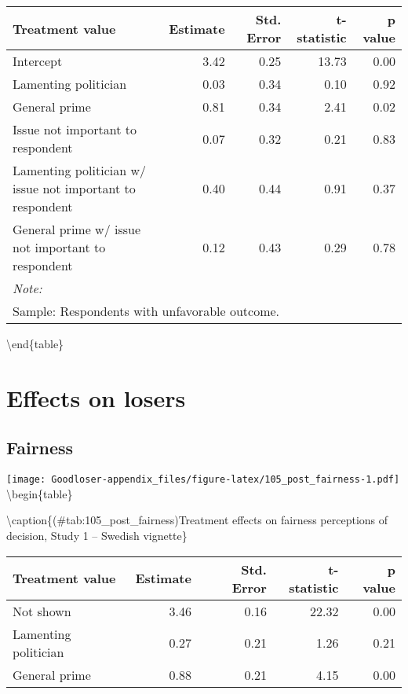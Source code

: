 \documentclass[
]{book}
\begin{document}
\begin{tabular}[t]{lrrrr}
\toprule
Treatment value & Estimate & Std. Error & t-statistic & p value\\
\midrule
Intercept & 3.42 & 0.25 & 13.73 & 0.00\\
Lamenting politician & 0.03 & 0.34 & 0.10 & 0.92\\
General prime & 0.81 & 0.34 & 2.41 & 0.02\\
Issue not important to respondent & 0.07 & 0.32 & 0.21 & 0.83\\
Lamenting politician w/ issue not important to respondent & 0.40 & 0.44 & 0.91 & 0.37\\
\addlinespace
General prime w/ issue not important to respondent & 0.12 & 0.43 & 0.29 & 0.78\\
\bottomrule
\multicolumn{5}{l}{\textit{Note: }}\\
\multicolumn{5}{l}{Sample: Respondents with unfavorable outcome.}\\
\end{tabular}

\textbackslash end\{table\}

\hypertarget{effects-on-losers}{%
\chapter{Effects on losers}\label{effects-on-losers}}

\hypertarget{fairness-1}{%
\section{Fairness}\label{fairness-1}}

\texttt{[image: Goodloser-appendix\_files/figure-latex/105\_post\_fairness-1.pdf]} \textbackslash begin\{table\}

\textbackslash caption\{(\#tab:105\_post\_fairness)Treatment effects on fairness perceptions of decision, Study 1 -- Swedish vignette\}
\centering

\begin{tabular}[t]{lrrrr}
\toprule
Treatment value & Estimate & Std. Error & t-statistic & p value\\
\midrule
Not shown & 3.46 & 0.16 & 22.32 & 0.00\\
Lamenting politician & 0.27 & 0.21 & 1.26 & 0.21\\
General prime & 0.88 & 0.21 & 4.15 & 0.00\\
\bottomrule
\end{tabular}
\end{document}
